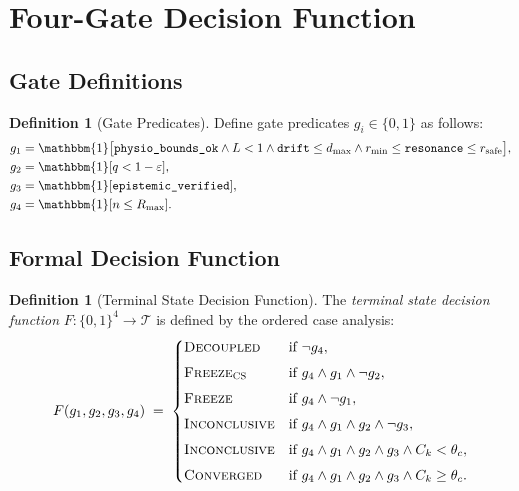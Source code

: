 \documentclass[11pt,a4paper]{article}
\theoremstyle{tealstyle}
\theoremstyle{definition}
\newtheorem{definition}[theorem]{Definition}
\newcommand{\eps}{\varepsilon}
\newcommand{\topk}{C_k}
\newcommand{\qwit}{q}
\newcommand{\Rmax}{R_{\max}}
\newcommand{\TermState}{\mathcal{T}}
\newcommand{\F}{F}
\newcommand{\boolset}{\{0,1\}}
\newcommand{\converged}{\textsc{Converged}}
\newcommand{\freeze}{\textsc{Freeze}}
\newcommand{\freezecs}{\textsc{Freeze\textsubscript{CS}}}
\newcommand{\decoupled}{\textsc{Decoupled}}
\newcommand{\inconclusive}{\textsc{Inconclusive}}
\begin{document}
\section{Four-Gate Decision Function}
\label{sec:gates}

\subsection{Gate Definitions}

\begin{definition}[Gate Predicates]
\label{def:gates}
Define gate predicates $g_i \in \boolset$ as follows:
\[
\begin{aligned}
  g_1 &= \mathbbm{1}\bigl[\texttt{physio\_bounds\_ok}
         \wedge L < 1
         \wedge \texttt{drift} \le d_{\max}
         \wedge r_{\min} \le \texttt{resonance} \le r_{\mathrm{safe}}\bigr], \\
  g_2 &= \mathbbm{1}[\qwit < 1 - \eps], \\
  g_3 &= \mathbbm{1}[\texttt{epistemic\_verified}], \\
  g_4 &= \mathbbm{1}[n \le \Rmax].
\end{aligned}
\]
\end{definition}

\subsection{Formal Decision Function}

\begin{definition}[Terminal State Decision Function]
\label{def:decision}
The \emph{terminal state decision function}
$\F\colon \boolset^4 \to \TermState$ is defined by the ordered
case analysis:
\begin{equation}
  \label{eq:decision}
  \F(g_1, g_2, g_3, g_4) \;=\;
  \begin{cases}
    \decoupled  & \text{if } \neg g_4, \\[4pt]
    \freezecs   & \text{if } g_4 \wedge g_1 \wedge \neg g_2, \\[4pt]
    \freeze     & \text{if } g_4 \wedge \neg g_1, \\[4pt]
    \inconclusive
                & \text{if } g_4 \wedge g_1 \wedge g_2 \wedge \neg g_3, \\[4pt]
    \inconclusive
                & \text{if } g_4 \wedge g_1 \wedge g_2 \wedge g_3
                             \wedge \topk < \theta_c, \\[4pt]
    \converged  & \text{if } g_4 \wedge g_1 \wedge g_2 \wedge g_3
                             \wedge \topk \ge \theta_c.
  \end{cases}
\end{equation}
\end{definition}
\end{document}

